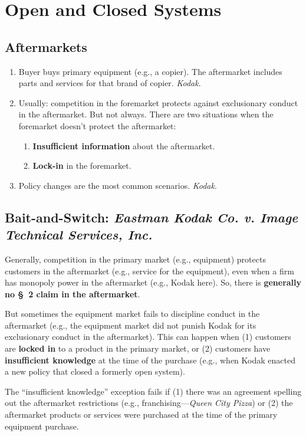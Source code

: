 \section{Open and Closed Systems}

\subsection{Aftermarkets}

\begin{enumerate}
    \item Buyer buys primary equipment (e.g., a copier). The aftermarket 
    includes parts and services for that brand of copier. \emph{Kodak}.
    \item Usually: competition in the foremarket protects against exclusionary 
    conduct in the aftermarket. But not always. There are two situations when 
    the foremarket doesn't protect the aftermarket:
    \begin{enumerate}
        \item \textbf{Insufficient information} about the aftermarket.
        \item \textbf{Lock-in} in the foremarket.
    \end{enumerate}
    \item Policy changes are the most common scenarios. \emph{Kodak}.
\end{enumerate}

\subsection{Bait-and-Switch: \emph{Eastman Kodak Co. v. Image Technical 
Services, Inc.}}

Generally, competition in the primary market (e.g., equipment) protects 
customers in the aftermarket (e.g., service for the equipment), even when a 
firm has monopoly power in the aftermarket (e.g., Kodak here). So, there is 
\textbf{generally no \S\ 2 claim in the aftermarket}.

But sometimes the equipment market fails to discipline conduct in the 
aftermarket (e.g., the equipment market did not punish Kodak for its 
exclusionary conduct in the aftermarket). This can happen when (1) customers 
are \textbf{locked in} to a product in the primary market, or (2) customers 
have \textbf{insufficient knowledge} at the time of the purchase (e.g., when 
Kodak enacted a new policy that closed a formerly open system).

The ``insufficient knowledge'' exception fails if (1) there was an agreement 
spelling out the aftermarket restrictions (e.g., franchising---\emph{Queen 
City Pizza}) or (2) the aftermarket products or services were purchased at the 
time of the primary equipment purchase.

